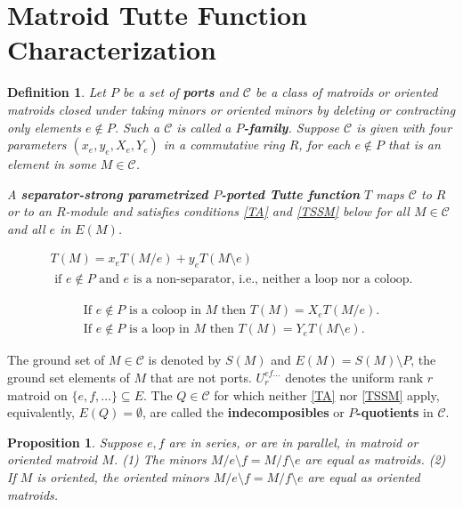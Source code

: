 \documentclass[12pt,leqno]{amsart}
\newtheorem{prop}[lem]{Proposition}
\newtheorem{definition}[lem]{Definition}
\theoremstyle{remark}
\begin{document}
\section{Matroid Tutte Function Characterization}
\label{ParamTutteSec}

\begin{definition}
\label{SSTMDefinition}
Let $P$ be a set of \textbf{ports} and $\mathcal{C}$ be a class of matroids or
oriented matroids closed under taking minors or oriented minors
by deleting or contracting only elements $e\not\in P$.
Such a $\mathcal{C}$ is called a \textbf{$P$-family}.  
Suppose $\mathcal{C}$ is
given with four parameters $(x_e,y_e,X_e,Y_e)$
in a commutative ring $R$, for each $e\not\in P$ that is an element
in some $M\in\mathcal{C}$.

A \textbf{separator-strong parametrized $P$-ported Tutte function}
$T$ maps $\mathcal{C}$ to $R$ or to an $R$-module and satisfies 
conditions 
\eqref{TA} and \eqref{TSSM} below for all $M\in\mathcal{C}$ and
all $e$ in $E(M)$.

\begin{equation}
\label{TA}
\tag{TA}
\begin{gathered}
T(M) = x_e T(M/e) + y_e T(M\setminus e) \\
\text{ if $e\not\in P$ and $e$ is a non-separator, 
       i.e., neither a loop nor a coloop.}
\end{gathered}
\end{equation}


\begin{equation}
\label{TSSM}
\tag{TSSM}
\begin{gathered}
\text{If } e\not\in P\text{ is a coloop in }M\text{ then }
T(M)=X_e T(M/e).\\
\text{If } e\not\in P\text{ is a loop in }M\text{ then }
T(M)=Y_e T(M\setminus e).
\end{gathered}
\end{equation}

\end{definition}

The ground set of $M\in\mathcal{C}$ is denoted by $S(M)$ and
$E(M) = S(M)\setminus P$, the ground set elements of $M$ that are 
not ports.  $U^{ef\ldots}_r$ denotes the uniform rank $r$ matroid 
on $\{e,f,\ldots\}\subseteq E$.
The $Q\in \mathcal{C}$ for which neither \eqref{TA} nor
\eqref{TSSM} apply, equivalently, $E(Q)=\emptyset$,
are called the \textbf{indecomposibles} or
\textbf{$P$-quotients} in $\mathcal{C}$.


\begin{prop}
\label{SameMinorProp}
Suppose $e,f$ are in series, or are in parallel, in matroid or
oriented matroid $M$.
(1) The minors $M/e\setminus f=M/f\setminus e$
are equal as matroids.
(2) If $M$ is oriented, the oriented minors 
$M/e\setminus f=M/f\setminus e$ are equal as oriented matroids.
\end{prop}
\end{document}
